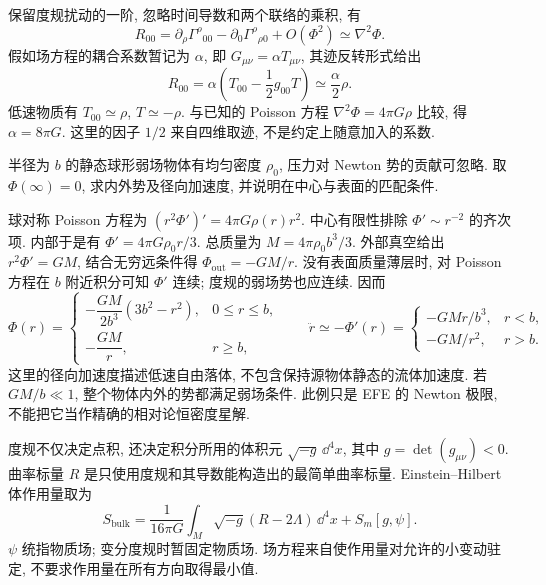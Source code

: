 保留度规扰动的一阶, 忽略时间导数和两个联络的乘积, 有
\[
 R_{00}=\partial_\rho\Gamma^\rho{}_{00}
          -\partial_0\Gamma^\rho{}_{\rho0}+O(\Phi^2)
       \simeq\nabla^2\Phi.
\]
假如场方程的耦合系数暂记为 $\alpha$, 即 $G_{\mu\nu}=\alpha T_{\mu\nu}$, 其迹反转形式给出
\[
 R_{00}=\alpha\left(T_{00}-\frac12g_{00}T\right)
        \simeq\frac\alpha2\rho.
\]
低速物质有 $T_{00}\simeq\rho$, $T\simeq-\rho$. 与已知的 Poisson 方程 $\nabla^2\Phi=4\pi G\rho$ 比较, 得 $\alpha=8\pi G$. 这里的因子 $1/2$ 来自四维取迹, 不是约定上随意加入的系数.

\begin{example}
半径为 $b$ 的静态球形弱场物体有均匀密度 $\rho_0$, 压力对 Newton 势的贡献可忽略. 取 $\Phi(\infty)=0$, 求内外势及径向加速度, 并说明在中心与表面的匹配条件.
\end{example}
\begin{solution}
球对称 Poisson 方程为 $(r^2\Phi')'=4\pi G\rho(r)r^2$. 中心有限性排除 $\Phi'\sim r^{-2}$ 的齐次项. 内部于是有 $\Phi'=4\pi G\rho_0r/3$. 总质量为 $M=4\pi\rho_0b^3/3$. 外部真空给出 $r^2\Phi'=GM$, 结合无穷远条件得 $\Phi_{\mathrm{out}}=-GM/r$. 没有表面质量薄层时, 对 Poisson 方程在 $b$ 附近积分可知 $\Phi'$ 连续; 度规的弱场势也应连续. 因而
\[
 \Phi(r)=\begin{cases}
 -\dfrac{GM}{2b^3}(3b^2-r^2),&0\le r\le b,\\[3pt]
 -\dfrac{GM}{r},&r\ge b,
 \end{cases}
 \qquad
 \ddot r\simeq-\Phi'(r)=\begin{cases}
 -GM r/b^3,&r<b,\\
 -GM/r^2,&r>b.
 \end{cases}
\]
这里的径向加速度描述低速自由落体, 不包含保持源物体静态的流体加速度. 若 $GM/b\ll1$, 整个物体内外的势都满足弱场条件. 此例只是 EFE 的 Newton 极限, 不能把它当作精确的相对论恒密度星解.
\end{solution}


度规不仅决定点积, 还决定积分所用的体积元 $\sqrt{-g}\,\dd^4x$, 其中 $g=\det(g_{\mu\nu})<0$. 曲率标量 $R$ 是只使用度规和其导数能构造出的最简单曲率标量. Einstein--Hilbert 体作用量取为
\begin{equation}\label{gr4-action}
 S_{\mathrm{bulk}}=\frac1{16\pi G}\int_M\sqrt{-g}(R-2\Lambda)\,\dd^4x
                    +S_m[g,\psi].
\end{equation}
$\psi$ 统指物质场; 变分度规时暂固定物质场. 场方程来自使作用量对允许的小变动驻定, 不要求作用量在所有方向取得最小值.

